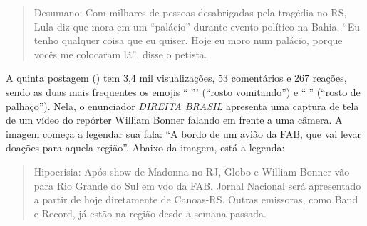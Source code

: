 \documentclass[portuguese]{textolivre}
\begin{document}
\begin{quote}
    Desumano: Com milhares de pessoas desabrigadas pela tragédia no RS, Lula diz que mora em um ``palácio'' durante evento político na Bahia. ``Eu tenho qualquer coisa que eu quiser. Hoje eu moro num palácio, porque vocês me colocaram lá'', disse o petista.
\end{quote}

A quinta postagem () tem 3,4 mil visualizações, 53 comentários e 267 reações, sendo as duas mais frequentes os emojis ``{\Symbola 🤮}''' (``rosto vomitando'') e ``{\Symbola 🤡}'' (``rosto de palhaço''). Nela, o enunciador \emph{DIREITA BRASIL} apresenta uma captura de tela de um vídeo do repórter William Bonner falando em frente a uma câmera. A imagem começa a legendar sua fala: ``A bordo de um avião da FAB, que vai levar doações para aquela região''. Abaixo da imagem, está a legenda:

\begin{quote}
    Hipocrisia: Após show de Madonna no RJ, Globo e William Bonner vão para Rio Grande do Sul em voo da FAB. Jornal Nacional será apresentado a partir de hoje diretamente de Canoas-RS. Outras emissoras, como Band e Record, já estão na região desde a semana passada.
\end{quote}
\end{document}
